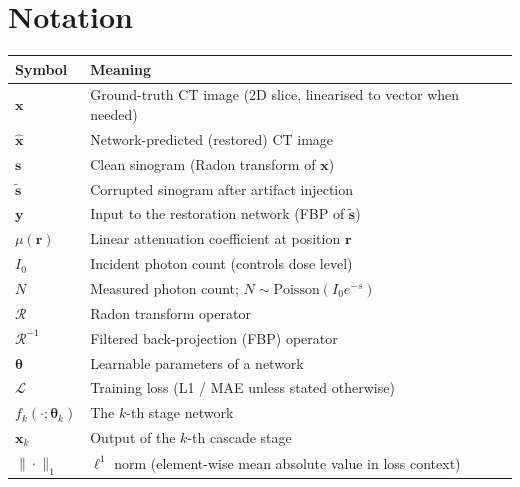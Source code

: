 
\chapter*{Notation}

\begin{tabular}{p{} p{}}
    \toprule
    \textbf{Symbol} & \textbf{Meaning} \\
    \midrule
    $\boldsymbol{x}$        & Ground-truth CT image (2D slice, linearised to vector when needed) \\
    $\boldsymbol{\hat{x}}$  & Network-predicted (restored) CT image \\
    $\boldsymbol{s}$        & Clean sinogram (Radon transform of $\boldsymbol{x}$) \\
    $\boldsymbol{\tilde{s}}$& Corrupted sinogram after artifact injection \\
    $\boldsymbol{y}$        & Input to the restoration network (FBP of $\boldsymbol{\tilde{s}}$) \\
    $\mu(\boldsymbol{r})$   & Linear attenuation coefficient at position $\boldsymbol{r}$ \\
    $I_0$                   & Incident photon count (controls dose level) \\
    $N$                     & Measured photon count; $N \sim \mathrm{Poisson}(I_0 e^{-s})$ \\
    $\mathcal{R}$           & Radon transform operator \\
    $\mathcal{R}^{-1}$      & Filtered back-projection (FBP) operator \\
    $\boldsymbol{\theta}$   & Learnable parameters of a network \\
    $\mathcal{L}$           & Training loss (L1 / MAE unless stated otherwise) \\
    $f_k(\cdot;\boldsymbol{\theta}_k)$ & The $k$-th stage network \\
    $\boldsymbol{x}_k$      & Output of the $k$-th cascade stage \\
    $\|\cdot\|_1$           & $\ell^1$ norm (element-wise mean absolute value in loss context) \\
    \bottomrule
\end{tabular}
